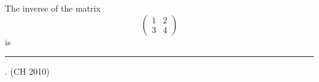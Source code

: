\item 
 The inverse of the matrix 
 \[
 \begin{pmatrix}
     1 & 2\\
     3 & 4
 \end{pmatrix}  
 \] 
is \rule{1cm}{0.01pt}.
\hfill{(CH 2010)}
 

